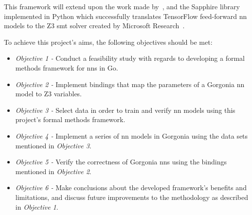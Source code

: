 This framework will extend upon the work made by~\citep{kokke2020}, and the Sapphire library implemented in Python
which successfully translates TensorFlow feed-forward \gls{nn} models to the Z3 \Gls{smt} solver created by Microsoft Research~\citep{demoura2008}.



To achieve this project's aims, the following objectives should be met:

\begin{itemize}
    \setlength\itemsep{0em}
    \item \textit{Objective 1 -} Conduct a feasibility study with regards to developing a formal methods framework for \glspl{nn} in Go.
    \item \textit{Objective 2 -} Implement bindings that map the parameters of a Gorgonia \gls{nn} model to
        Z3 variables.
    \item \textit{Objective 3 -} Select data in order to train and verify \gls{nn} models using this project's formal methods framework.
    \item \textit{Objective 4 -} Implement a series of \gls{nn} models in Gorgonia using the data sets mentioned in \textit{Objective 3}.
    \item \textit{Objective 5 -} Verify the correctness of Gorgonia \glspl{nn} using the bindings mentioned in \textit{Objective 2}.
    \item \textit{Objective 6 -} Make conclusions about the developed framework's benefits and limitations, and discuss future improvements to the methodology as described in \textit{Objective 1}.
\end{itemize}
